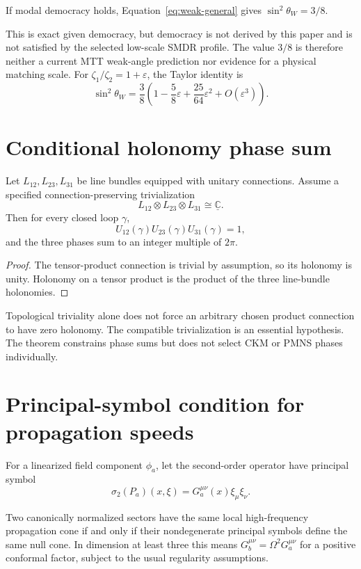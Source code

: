 \documentclass[11pt]{article}
\begin{document}
\begin{corollary}
If modal democracy holds, Equation~\eqref{eq:weak-general} gives
$\sin^2\theta_W=3/8$.
\end{corollary}

This is exact given democracy, but democracy is not derived by this paper and
is not satisfied by the selected low-scale SMDR profile. The value $3/8$ is
therefore neither a current MTT weak-angle prediction nor evidence for a
physical matching scale. For
$\zeta_1/\zeta_2=1+\varepsilon$, the Taylor identity is
\[
\sin^2\theta_W=\frac38\left(1-\frac58\varepsilon
+\frac{25}{64}\varepsilon^2+O(\varepsilon^3)\right).
\]

\section{Conditional holonomy phase sum}

\begin{theorem}
Let $L_{12},L_{23},L_{31}$ be line bundles equipped with unitary connections.
Assume a specified connection-preserving trivialization
\[
L_{12}\otimes L_{23}\otimes L_{31}\cong\underline{\mathbb C}.
\]
Then for every closed loop $\gamma$,
\[
U_{12}(\gamma)U_{23}(\gamma)U_{31}(\gamma)=1,
\]
and the three phases sum to an integer multiple of $2\pi$.
\end{theorem}

\begin{proof}
The tensor-product connection is trivial by assumption, so its holonomy is
unity. Holonomy on a tensor product is the product of the three line-bundle
holonomies.
\end{proof}

Topological triviality alone does not force an arbitrary chosen product
connection to have zero holonomy. The compatible trivialization is an essential
hypothesis. The theorem constrains phase sums but does not select CKM or PMNS
phases individually.

\section{Principal-symbol condition for propagation speeds}

For a linearized field component $\phi_a$, let the second-order operator have
principal symbol
\[
\sigma_2(P_a)(x,\xi)=G_a^{\mu\nu}(x)\xi_\mu\xi_\nu.
\]

\begin{theorem}
Two canonically normalized sectors have the same local high-frequency
propagation cone if and only if their nondegenerate principal symbols define
the same null cone. In dimension at least three this means
$G_b^{\mu\nu}=\Omega^2G_a^{\mu\nu}$ for a positive conformal factor, subject to
the usual regularity assumptions.
\end{theorem}
\end{document}
